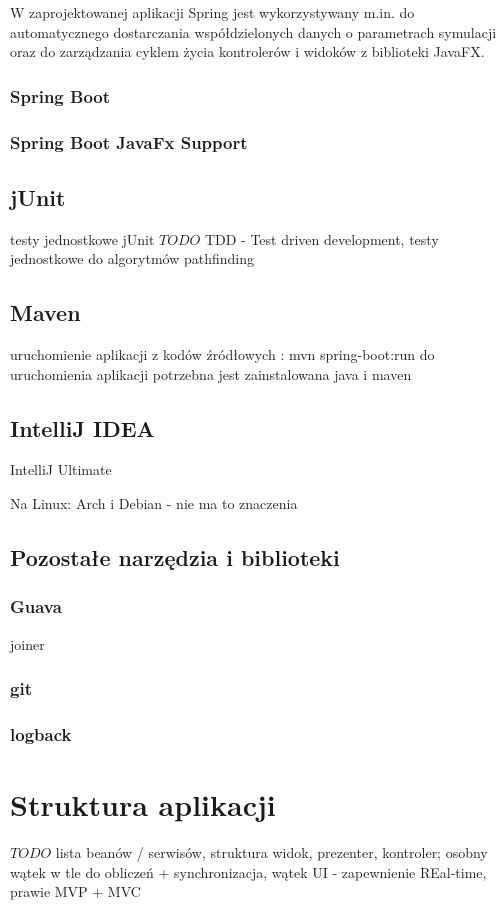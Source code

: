 W zaprojektowanej aplikacji Spring jest wykorzystywany m.in. do automatycznego dostarczania współdzielonych danych o parametrach symulacji oraz do zarządzania cyklem życia kontrolerów i widoków z biblioteki JavaFX.

\subsubsection{Spring Boot}

\subsubsection{Spring Boot JavaFx Support}

\subsection{jUnit}
testy jednostkowe jUnit
$TODO$ TDD - Test driven development, testy jednostkowe do algorytmów pathfinding

\subsection{Maven}
uruchomienie aplikacji z kodów źródłowych : mvn spring-boot:run
do uruchomienia aplikacji potrzebna jest zainstalowana java i maven

\subsection{IntelliJ IDEA}
IntelliJ Ultimate

Na Linux: Arch i Debian - nie ma to znaczenia

\subsection{Pozostałe narzędzia i biblioteki}
\subsubsection{Guava}
joiner
\subsubsection{git}
\subsubsection{logback}


\section{Struktura aplikacji}
$TODO$ lista beanów / serwisów, struktura widok, prezenter, kontroler; osobny wątek w tle do obliczeń + synchronizacja, wątek UI - zapewnienie REal-time, prawie MVP + MVC


